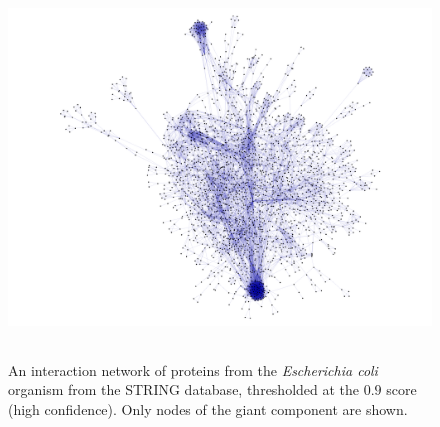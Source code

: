 \begin{figure}
\includegraphics[height=10cm]{ecoli_giant_at_900.png}
\caption{An interaction network of proteins from the \textit{Escherichia coli} organism from the STRING database, thresholded at the $0.9$ score (high confidence). Only nodes of the giant component are shown.}
\label{fig:ecoli_giant_at_900}
\end{figure}